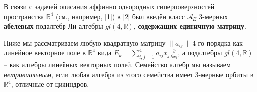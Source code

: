 



\vzmscaption

В связи с задачей описания аффинно однородных гиперповерхностей пространства $\mathbb{R}^4$ (см., например, [1]) в [2] был введён класс $\mathcal{A}_E$ 3-мерных \textbf{абелевых} подалгебр Ли алгебры $gl(4,\mathbb{R})$,  \textbf{содержащих единичную матрицу}.

Ниже мы рассматриваем любую квадратную матрицу $ \|a_{ij}\| $ 4-го порядка как линейное векторное поле в $\mathbb{R}^4 $ вида $E_k = \sum_{i,j =1 }^4 {a_{ij} x_j} \frac{\partial}{\partial x_i}$, а подалгебры $gl(4,\mathbb{R})$ --  как алгебры линейных векторных полей. Семейство алгебр мы называем \textit{нетривиальным}, если любая алгебра из этого семейства имеет 3-мерные орбиты в $\mathbb{R}^4$, отличные от цилиндров.


